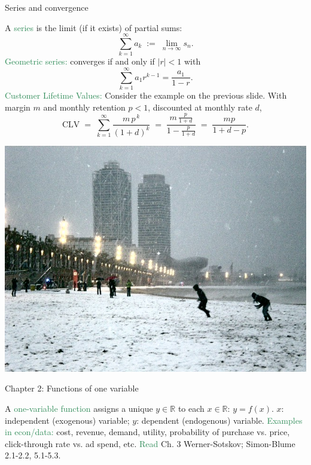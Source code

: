 \documentclass[11pt,aspectratio=169]{beamer}
\begin{document}
\begin{frame}{Series and convergence}

A \textcolor{SeaGreen}{series} is the limit (if it exists) of partial sums: 
\[
\sum_{k=1}^{\infty} a_k\; :=\; \lim_{n\to\infty} s_n.
\]
\textcolor{SeaGreen}{Geometric series:} converges if and only if $|r|<1$ with
\[
\sum_{k=1}^{\infty} a_1 r^{k-1}=\frac{a_1}{1-r}.
\]
\textcolor{SeaGreen}{Customer Lifetime Values:} Consider the example on the previous slide. With margin $m$ and monthly retention $p<1$, discounted at monthly rate $d$,
\[
\text{CLV}\;=\;\sum_{k=1}^\infty \frac{m\,p^{\,k}}{(1+d)^k}\;=\;\frac{m\,\frac{p}{1+d}}{1-\frac{p}{1+d}}\;=\;\frac{mp}{1+d-p}.
\]
\end{frame}


\begin{frame}[plain] %
  \centering\includegraphics[height=1.2\paperheight]{vbreaks/vb2.jpg}
\end{frame}





\begin{frame}{Chapter 2: Functions of one variable}

A \textcolor{SeaGreen}{one-variable function} assigns a unique $y\in\mathbb{R}$ to each $x\in\mathbb{R}$: $y=f(x)$. 
\vskip 10pt
$x$: independent (exogenous) variable; $y$: dependent (endogenous) variable.
\vskip 8pt
\textcolor{SeaGreen}{Examples in econ/data:} cost, revenue, demand, utility, probability of purchase vs. price, click-through rate vs. ad spend, etc.
\vskip 8pt
\textcolor{SeaGreen}{Read} Ch. 3 Werner-Sotskov; Simon-Blume 2.1-2.2, 5.1-5.3.
\end{frame}
\end{document}
